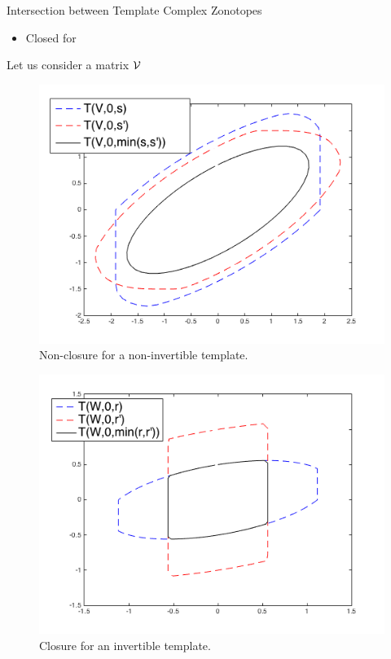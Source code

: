 \begin{frame}{Intersection between Template Complex Zonotopes}
%
\begin{itemize}
\item Closed for 
\end{itemize}
%
\begin{block}{}
Let us consider a  matrix $\mathcal{V}$
%

\begin{center}
\end{center}
%
\end{block}
%
\begin{minipage}{0.48\textwidth}
\begin{figure}
  \center
  \caption{Non-closure  for a non-invertible template.}
  \includegraphics[scale=0.3]{figures/CZtopes/nonclosure.png}
\end{figure}
\end{minipage}
%
\begin{minipage}{0.48\textwidth}
\begin{figure}
  \center
  \caption{Closure for an invertible template.}
  \includegraphics[scale=0.35]{figures/CZtopes/closure.png}

\end{figure}
\end{minipage}
\end{frame}
